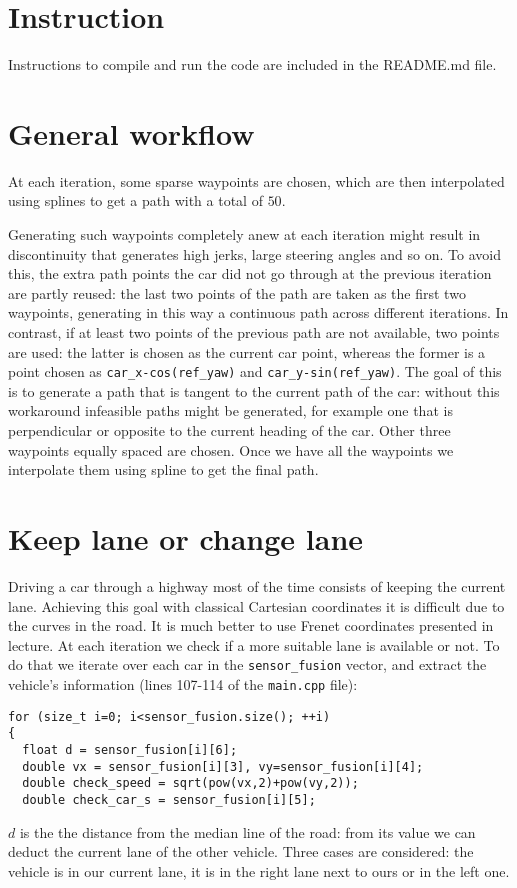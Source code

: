 \documentclass{article}
\let\cd\lstinline
\begin{document}
\section{Instruction}
Instructions to compile and run the code are included in the README.md file.

\section{General workflow}
At each iteration, some sparse waypoints are chosen, which are then interpolated using splines to get a path with a total of $50$.

Generating such waypoints completely anew at each iteration might result in discontinuity that generates high jerks, large steering angles and so on. To avoid this, the extra path points the car did not go through at the previous iteration are partly reused: the last two points of the path are taken as the first two waypoints, generating in this way a continuous path across different iterations. In contrast, if at least two points of the previous path are not available, two points are used: the latter is chosen as the current car point, whereas the former is a point chosen as \cd+car_x-cos(ref_yaw)+ and \cd+car_y-sin(ref_yaw)+. The goal of this is to generate a path that is tangent to the current path of the car: without this workaround infeasible paths might be generated, for example one that is perpendicular or opposite to the current heading of the car. Other three waypoints equally spaced are chosen. Once we have all the waypoints we interpolate them using spline to get the final path.


\section{Keep lane or change lane}
Driving a car through a highway most of the time consists of keeping the current lane. Achieving this goal with classical Cartesian coordinates it is difficult due to the curves in the road. It is much better to use Frenet coordinates presented in lecture. At each iteration we check if a more suitable lane is available or not. To do that we iterate over each car in the \cd+sensor_fusion+ vector, and 
extract the vehicle's information (lines 107-114 of the \cd+main.cpp+ file):
\begin{lstlisting}
for (size_t i=0; i<sensor_fusion.size(); ++i)
{
  float d = sensor_fusion[i][6];
  double vx = sensor_fusion[i][3], vy=sensor_fusion[i][4];
  double check_speed = sqrt(pow(vx,2)+pow(vy,2));
  double check_car_s = sensor_fusion[i][5];              
\end{lstlisting}
$d$ is the the distance from the median line of the road: from its value we can deduct the current lane of the other vehicle. Three cases are considered: the vehicle is in our current lane, it is in the right lane next to ours or in the left one. 
\end{document}
